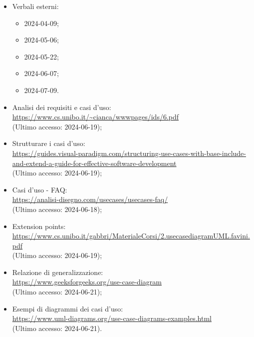 \begin{itemize}
  \item Verbali esterni:
  \begin{itemize}
    \item 2024-04-09;
    \item 2024-05-06;
    \item 2024-05-22;
    \item 2024-06-07;
    \item 2024-07-09.
  \end{itemize}
  \item Analisi dei requisiti e casi d'uso:\\ \href{https://www.cs.unibo.it/~cianca/wwwpages/ids/6.pdf}{https://www.cs.unibo.it/\textasciitilde cianca/wwwpages/ids/6.pdf}  \\ (Ultimo accesso: 2024-06-19);
  \item Strutturare i casi d'uso:\\ \href{https://guides.visual-paradigm.com/structuring-use-cases-with-base-include-and-extend-a-guide-for-effective-software-development}{https://guides.visual-paradigm.com/structuring-use-cases-with-base-include-and-extend-a-guide-for-effective-software-development}  \\ (Ultimo accesso: 2024-06-19);
  \item Casi d'uso - FAQ:\\ \href{https://analisi-disegno.com/usecases/usecases-faq}{https://analisi-disegno.com/usecases/usecases-faq/}  \\ (Ultimo accesso: 2024-06-18);
  \item Extension points:\\ \href{https://www.cs.unibo.it/gabbri/MaterialeCorsi/2.usecasediagramUML.favini.pdf}{https://www.cs.unibo.it/gabbri/MaterialeCorsi/2.usecasediagramUML.favini.pdf}  \\ (Ultimo accesso: 2024-06-19);
  \item Relazione di generalizzazione:\\ \href{https://www.geeksforgeeks.org/use-case-diagram}{https://www.geeksforgeeks.org/use-case-diagram}  \\ (Ultimo accesso: 2024-06-21);
  \item Esempi di diagrammi dei casi d'uso:\\ \href{https://www.uml-diagrams.org/use-case-diagrams-examples.html}{https://www.uml-diagrams.org/use-case-diagrams-examples.html}  \\ (Ultimo accesso: 2024-06-21).
\end{itemize}
